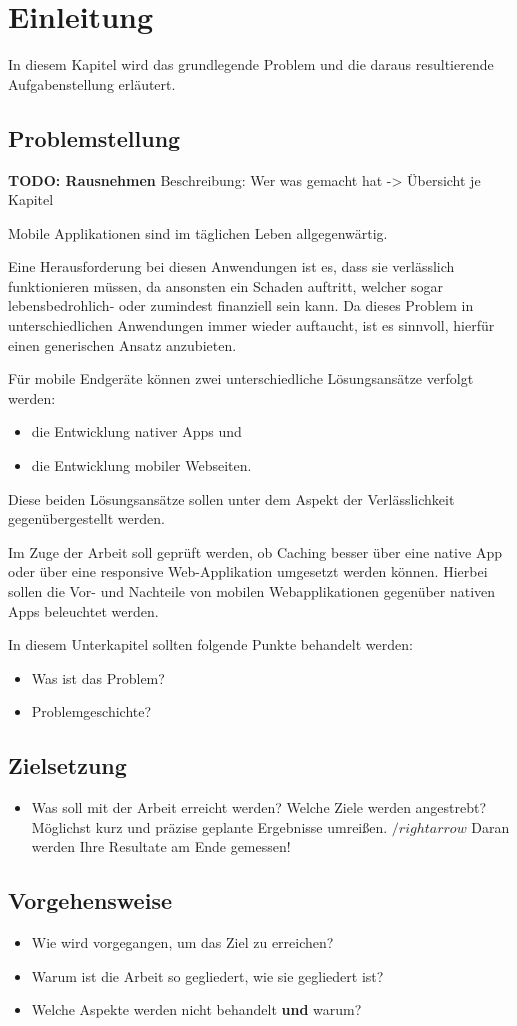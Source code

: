 \chapter{Einleitung}
\label{cha:einleitung}
In diesem Kapitel wird das grundlegende Problem und die daraus resultierende Aufgabenstellung erläutert.

\section{Problemstellung}
\label{sec:problemstellung}

\textbf{TODO: Rausnehmen}
Beschreibung: Wer was gemacht hat -> Übersicht je Kapitel

Mobile Applikationen sind im täglichen Leben allgegenwärtig.
 
Eine Herausforderung bei diesen Anwendungen ist es, dass sie verlässlich funktionieren müssen, da ansonsten ein Schaden auftritt, welcher sogar lebensbedrohlich- oder zumindest finanziell sein kann.
Da dieses Problem in unterschiedlichen Anwendungen  immer wieder auftaucht, ist es sinnvoll, hierfür einen generischen Ansatz anzubieten. 

Für mobile Endgeräte können zwei unterschiedliche Lösungsansätze verfolgt werden: 
\begin{itemize}
\item die Entwicklung nativer Apps und
\item die Entwicklung mobiler Webseiten.
\end{itemize}
Diese beiden Lösungsansätze sollen unter dem Aspekt der Verlässlichkeit gegenübergestellt werden.

Im Zuge der Arbeit soll geprüft werden, ob Caching besser über eine native App oder über eine responsive Web-Applikation umgesetzt werden können. 
Hierbei sollen die Vor- und Nachteile von mobilen Webapplikationen gegenüber nativen Apps beleuchtet werden.


In diesem Unterkapitel sollten folgende Punkte behandelt werden:
\begin{itemize}
	\item Was ist das Problem?
	\item Problemgeschichte?
\end{itemize}

\section{Zielsetzung}
\label{sec:zielsetzung}
\begin{itemize}
	\item Was soll mit der Arbeit erreicht werden? Welche Ziele werden angestrebt? Möglichst kurz und präzise geplante Ergebnisse umreißen. $/rightarrow$ Daran werden Ihre Resultate am Ende gemessen!

\end{itemize}


\section{Vorgehensweise}
\label{sec:vorgehensweise}
\begin{itemize}
	\item Wie wird vorgegangen, um das Ziel zu erreichen?
	\item Warum ist die Arbeit so gegliedert, wie sie gegliedert ist?
	\item Welche Aspekte werden nicht behandelt \textbf{und} warum?
\end{itemize}